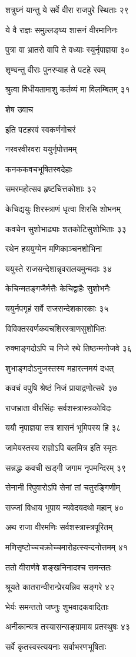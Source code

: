 शत्रुघ्नं यान्तु ये सर्वे वीरा राजपुरे स्थिताः २९

ये वै राज्ञः समुल्लङ्घ्य शासनं वीरमानिनः

पुत्रा वा भ्रातरो वापि ते वध्याः स्युर्नृपाज्ञया ३०

शृण्वन्तु वीराः पुनरप्याह ते पटहे रवम्

श्रुत्वा विधीयतामाशु कर्तव्यं मा विलम्बितम् ३१

शेष उवाच

इति पटहरवं स्वकर्णगोचरं

नरवरवीरवरा ययुर्नृपोत्तमम्

कनककवचभूषितस्वदेहाः

समरमहोत्सव हृष्टचित्तकोशाः ३२

केचिद्ययुः शिरस्त्राणं धृत्वा शिरसि शोभनम्

कवचेन सुशोभाढ्याः शतकोटिसुशोभिताः ३३

रथेन हययुग्मेन मणिकाञ्चनशोभिना

ययुस्ते राजसन्देशान्नृवरालयमुन्मदाः ३४

केचिन्मतङ्गजैर्मत्तैः केचिद्वाहैः सुशोभनैः

ययुर्नपगृहं सर्वे राजसन्देशकारकाः ३५

विविक्तस्वर्णकवचशिरस्त्राणसुशोभितः

रुक्माङ्गदोऽपि च निजे रथे तिष्ठन्मनोजवे ३६

शुभाङ्गदोऽनुजस्तस्य महारत्नमयं दधत्

कवचं वपुषि श्रेष्ठं निजं प्रायाद्रणोत्सवे ३७

राजभ्राता वीरसिंहः सर्वशस्त्रास्त्रकोविदः

ययौ नृपाज्ञया तत्र शासनं भूमिपस्य हि ३८

जामेयस्तस्य राज्ञोऽपि बलमित्र इति स्मृतः

सन्नद्धः कवची खड्गी जगाम नृपमन्दिरम् ३९

सेनानी रिपुवारोऽपि सेनां तां चतुरङ्गिणीम्

सज्जां विधाय भूपाय न्यवेदयदथो महान् ४०

अथ राजा वीरमणिः सर्वशस्त्रास्त्रपूरितम्

मणिसृष्टोच्चचक्रोच्चमारोहत्स्यन्दनोत्तमम् ४१

ततो वीरार्णवे शङ्खनिनादश्च समन्ततः

श्रूयते कातरान्वीरान्प्रेरयन्निव सङ्गरे ४२

भेर्यः समन्ततो जघ्नुः शुभवादकवादिताः

अनीकान्यत्र तस्यासन्सङ्ग्रामाय प्रतस्थुषः ४३

सर्वे कृतस्वस्त्ययनाः सर्वाभरणभूषिताः

